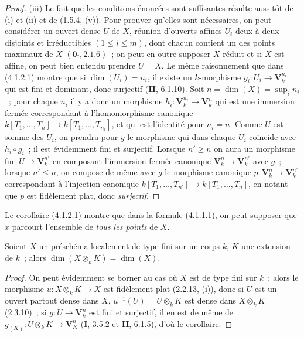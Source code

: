 \begin{proof}
(iii) Le fait que les conditions énoncées sont suffisantes résulte aussitôt de
(i) et (ii) et de (1.5.4, (v)). Pour prouver qu'elles sont nécessaires, on peut
considérer un ouvert dense $U$ de $X$, réunion d'ouverts affines $U_i$ deux à
deux disjoints et irréductibles $(1\leqslant i\leqslant m)$, dont chacun
contient un des points maximaux de $X$ $(\mathbf{0}_{\mathrm I},2.1.6)$~; on peut en
outre supposer $X$ réduit et si $X$ est affine, on peut bien entendu prendre
$U=X$. Le même
raisonnement que dans (4.1.2.1) montre que si $\dim(U_i)=n_i$, il existe un
$k$-morphisme $g_i:U_i\to\mathbf V_k^{n_i}$ qui est fini et dominant, donc
surjectif (\textbf{II}, 6.1.10). Soit $n=\dim(X)=\sup_i n_i$~; pour chaque $n_i$ il y a
donc un morphisme $h_i:\mathbf V_k^{n_i}\to\mathbf V_k^n$ qui est une
immersion fermée correspondant à l'homomorphisme canonique
$k[T_1,\ldots,T_n]\to k[T_1,\ldots,T_{n_i}]$, et qui est l'identité pour
$n_i=n$. Comme $U$ est somme des $U_i$, on prendra pour $g$ le morphisme qui
dans chaque $U_i$ coïncide avec $h_i\circ g_i$~; il est évidemment fini et
surjectif. Lorsque $n'\geqslant n$ on aura un morphisme fini
$U\to\mathbf V_k^{n'}$ en composant l'immersion fermée canonique
$\mathbf V_k^n\to\mathbf V_k^{n'}$ avec $g$~; lorsque $n'\leqslant n$, on
compose de même avec $g$ le morphisme canonique
$p:\mathbf V_k^n\to\mathbf V_k^{n'}$ correspondant à l'injection canonique
$k[T_1,\ldots,T_{n'}]\to k[T_1,\ldots,T_n]$, en notant que $p$ est fidèlement
plat, donc \emph{surjectif}.
\end{proof}

\begin{remark}[4.1.3]
\label{IV.2.4.1.3-fr}
Le corollaire (4.1.2.1) montre que dans la formule (4.1.1.1), on peut supposer
que $x$ parcourt l'ensemble de \emph{tous les points} de $X$.
\end{remark}

\begin{corollary}[4.1.4]
\label{IV.2.4.1.4-fr}
Soient $X$ un préschéma localement de type fini sur un corps $k$, $K$ une
extension de $k$~; alors $\dim(X\otimes_k K)=\dim(X)$.
\end{corollary}

\begin{proof}
On peut évidemment se borner au cas où $X$ est de type fini sur $k$~; alors le
morphisme $u:X\otimes_k K\to X$ est fidèlement plat (2.2.13, (i)), donc si
$U$ est un ouvert partout dense dans $X$, $u^{-1}(U)=U\otimes_k K$ est dense
dans $X\otimes_k K$ (2.3.10)~; si $g:U\to\mathbf V_k^n$ est fini et
surjectif, il en est de même de
$g_{(K)}:U\otimes_k K\to\mathbf V_K^n$ (\textbf{I}, 3.5.2 et \textbf{II}, 6.1.5), d'où le
corollaire.
\end{proof}

